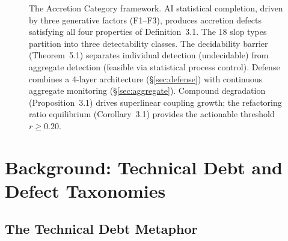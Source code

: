 \documentclass[11pt, a4paper, logo, copyright]{googledeepmind}
\begin{document}
\begin{figure}[p]
\caption{The Accretion Category framework. AI statistical completion, driven by three generative factors (F1--F3), produces accretion defects satisfying all four properties of Definition~3.1. The 18 slop types partition into three detectability classes. The decidability barrier (Theorem~5.1) separates individual detection (undecidable) from aggregate detection (feasible via statistical process control). Defense combines a 4-layer architecture (\S\ref{sec:defense}) with continuous aggregate monitoring (\S\ref{sec:aggregate}). Compound degradation (Proposition~3.1) drives superlinear coupling growth; the refactoring ratio equilibrium (Corollary~3.1) provides the actionable threshold $r \geq 0.20$.}
\label{fig:framework}
\end{figure}

\section{Background: Technical Debt and Defect Taxonomies}
\label{sec:background}

\subsection{The Technical Debt Metaphor}
\end{document}
